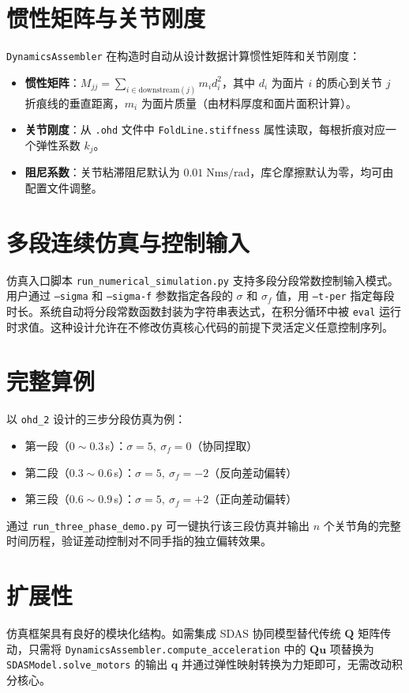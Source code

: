 \documentclass[12pt,a4paper]{article}
\begin{document}
\section{惯性矩阵与关节刚度}

\texttt{DynamicsAssembler} 在构造时自动从设计数据计算惯性矩阵和关节刚度：
\begin{itemize}
    \item \textbf{惯性矩阵}：$M_{jj} = \sum_{i\in\text{downstream}(j)} m_i d_i^2$，其中 $d_i$ 为面片 $i$ 的质心到关节 $j$ 折痕线的垂直距离，$m_i$ 为面片质量（由材料厚度和面片面积计算）。
    \item \textbf{关节刚度}：从 \texttt{.ohd} 文件中 \texttt{FoldLine.stiffness} 属性读取，每根折痕对应一个弹性系数 $k_j$。
    \item \textbf{阻尼系数}：关节粘滞阻尼默认为 $0.01\;\text{Nms/rad}$，库仑摩擦默认为零，均可由配置文件调整。
\end{itemize}

\section{多段连续仿真与控制输入}

仿真入口脚本 \texttt{run\_numerical\_simulation.py} 支持多段分段常数控制输入模式。用户通过 \texttt{--sigma} 和 \texttt{--sigma-f} 参数指定各段的 $\sigma$ 和 $\sigma_f$ 值，用 \texttt{--t-per} 指定每段时长。系统自动将分段常数函数封装为字符串表达式，在积分循环中被 \texttt{eval} 运行时求值。这种设计允许在不修改仿真核心代码的前提下灵活定义任意控制序列。

\section{完整算例}

以 \texttt{ohd\_2} 设计的三步分段仿真为例：
\begin{itemize}
    \item 第一段（$0\sim0.3$\,s）：$\sigma=5,\ \sigma_f=0$（协同捏取）
    \item 第二段（$0.3\sim0.6$\,s）：$\sigma=5,\ \sigma_f=-2$（反向差动偏转）
    \item 第三段（$0.6\sim0.9$\,s）：$\sigma=5,\ \sigma_f=+2$（正向差动偏转）
\end{itemize}
通过 \texttt{run\_three\_phase\_demo.py} 可一键执行该三段仿真并输出 $n$ 个关节角的完整时间历程，验证差动控制对不同手指的独立偏转效果。

\section{扩展性}

仿真框架具有良好的模块化结构。如需集成 SDAS 协同模型替代传统 $\mathbf{Q}$ 矩阵传动，只需将 \texttt{DynamicsAssembler.compute\_acceleration} 中的 $\mathbf{Q}\mathbf{u}$ 项替换为 \texttt{SDASModel.solve\_motors} 的输出 $\mathbf{q}$ 并通过弹性映射转换为力矩即可，无需改动积分核心。
\end{document}
